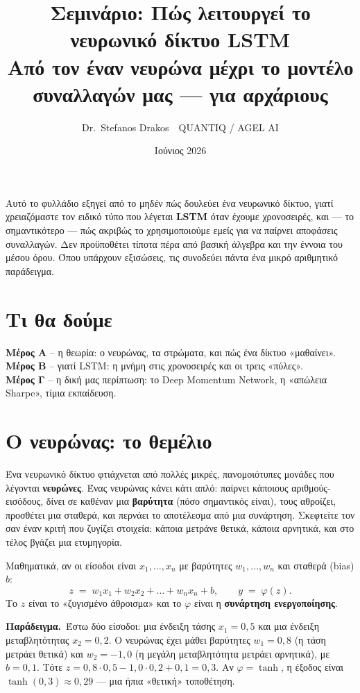\documentclass[11pt]{article}
\title{\textbf{\sffamily Σεμινάριο: Πώς λειτουργεί το νευρωνικό δίκτυο LSTM}\\[3pt]
\large Από τον έναν νευρώνα μέχρι το μοντέλο συναλλαγών μας --- για αρχάριους}
\author{Dr.\ Stefanos Drakos \,\textemdash\, QUANTIQ / AGEL AI}
\date{Ιούνιος 2026}
\newcommand{\ex}[1]{\par\smallskip\noindent\textbf{\textcolor{accent}{Παράδειγμα.}}\ #1\par\smallskip}
\begin{document}
\maketitle\thispagestyle{empty}

\noindent
Αυτό το φυλλάδιο εξηγεί από το μηδέν πώς δουλεύει ένα νευρωνικό δίκτυο, γιατί χρειαζόμαστε τον ειδικό
τύπο που λέγεται \textbf{LSTM} όταν έχουμε χρονοσειρές, και --- το σημαντικότερο --- πώς ακριβώς το
χρησιμοποιούμε εμείς για να παίρνει αποφάσεις συναλλαγών. Δεν προϋποθέτει τίποτα πέρα από βασική
άλγεβρα και την έννοια του μέσου όρου. Όπου υπάρχουν εξισώσεις, τις συνοδεύει πάντα ένα μικρό
αριθμητικό παράδειγμα.

\section*{Τι θα δούμε}
\textbf{Μέρος Α} -- η θεωρία: ο νευρώνας, τα στρώματα, και πώς ένα δίκτυο «μαθαίνει».\\
\textbf{Μέρος Β} -- γιατί LSTM: η μνήμη στις χρονοσειρές και οι τρεις «πύλες».\\
\textbf{Μέρος Γ} -- η δική μας περίπτωση: το Deep Momentum Network, η «απώλεια Sharpe», τίμια εκπαίδευση.

\section{Ο νευρώνας: το θεμέλιο}

Ένα νευρωνικό δίκτυο φτιάχνεται από πολλές μικρές, πανομοιότυπες μονάδες που λέγονται \textbf{νευρώνες}.
Ένας νευρώνας κάνει κάτι απλό: παίρνει κάποιους αριθμούς-εισόδους, δίνει σε καθέναν μια \textbf{βαρύτητα}
(πόσο σημαντικός είναι), τους αθροίζει, προσθέτει μια σταθερά, και περνάει το αποτέλεσμα από μια
συνάρτηση. Σκεφτείτε τον σαν έναν κριτή που ζυγίζει στοιχεία: κάποια μετράνε θετικά, κάποια αρνητικά,
και στο τέλος βγάζει μια ετυμηγορία.

Μαθηματικά, αν οι είσοδοι είναι $x_1,\dots,x_n$ με βαρύτητες $w_1,\dots,w_n$ και σταθερά (bias) $b$:
\[
z \;=\; w_1 x_1 + w_2 x_2 + \dots + w_n x_n + b, \qquad y \;=\; \varphi(z).
\]
Το $z$ είναι το «ζυγισμένο άθροισμα» και το $\varphi$ είναι η \textbf{συνάρτηση ενεργοποίησης}.

\ex{Έστω δύο είσοδοι: μια ένδειξη τάσης $x_1=0{,}5$ και μια ένδειξη μεταβλητότητας $x_2=0{,}2$. Ο
νευρώνας έχει μάθει βαρύτητες $w_1=0{,}8$ (η τάση μετράει θετικά) και $w_2=-1{,}0$ (η μεγάλη
μεταβλητότητα μετράει αρνητικά), με $b=0{,}1$. Τότε
$z = 0{,}8\cdot 0{,}5 - 1{,}0\cdot 0{,}2 + 0{,}1 = 0{,}3$. Αν $\varphi=\tanh$, η έξοδος είναι
$\tanh(0{,}3)\approx 0{,}29$ --- μια ήπια «θετική» τοποθέτηση.}
\end{document}
